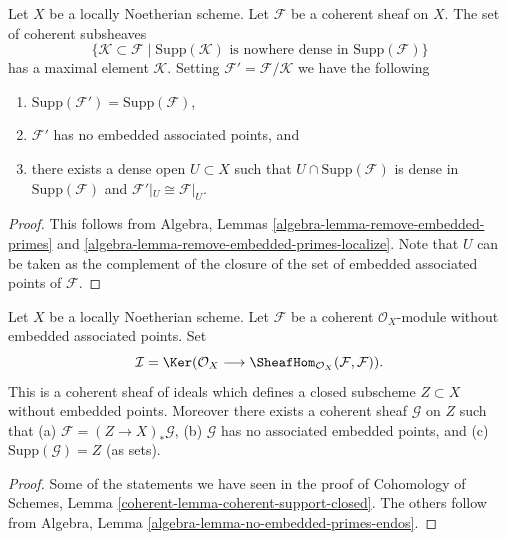 \begin{lemma}
\label{lemma-remove-embedded-points}
Let $X$ be a locally Noetherian scheme.
Let $\mathcal{F}$ be a coherent sheaf on $X$.
The set of coherent subsheaves
$$
\{
\mathcal{K} \subset \mathcal{F}
\mid
\text{Supp}(\mathcal{K})\text{ is nowhere dense in }\text{Supp}(\mathcal{F})
\}
$$
has a maximal element $\mathcal{K}$.
Setting $\mathcal{F}' = \mathcal{F}/\mathcal{K}$ we have the
following
\begin{enumerate}
\item $\text{Supp}(\mathcal{F}') = \text{Supp}(\mathcal{F})$,
\item $\mathcal{F}'$ has no embedded associated points, and
\item there exists a dense open $U \subset X$ such that
$U \cap \text{Supp}(\mathcal{F})$ is dense in $\text{Supp}(\mathcal{F})$
and $\mathcal{F}'|_U \cong \mathcal{F}|_U$.
\end{enumerate}
\end{lemma}

\begin{proof}
This follows from
Algebra, Lemmas \ref{algebra-lemma-remove-embedded-primes} and
\ref{algebra-lemma-remove-embedded-primes-localize}.
Note that $U$ can be taken as the complement of the closure
of the set of embedded associated points of $\mathcal{F}$.
\end{proof}

\begin{lemma}
\label{lemma-no-embedded-points-endos}
Let $X$ be a locally Noetherian scheme.
Let $\mathcal{F}$ be a coherent $\mathcal{O}_X$-module
without embedded associated points. Set
$$
\mathcal{I}
=
\Ker(\mathcal{O}_X
\longrightarrow
\SheafHom_{\mathcal{O}_X}(\mathcal{F}, \mathcal{F})).
$$
This is a coherent sheaf of ideals which defines a closed
subscheme $Z \subset X$ without embedded points. Moreover
there exists a coherent sheaf $\mathcal{G}$ on $Z$
such that (a) $\mathcal{F} = (Z \to X)_*\mathcal{G}$,
(b) $\mathcal{G}$ has no associated embedded points, and
(c) $\text{Supp}(\mathcal{G}) = Z$ (as sets).
\end{lemma}

\begin{proof}
Some of the statements we have seen in the proof of
Cohomology of Schemes, Lemma \ref{coherent-lemma-coherent-support-closed}.
The others follow from
Algebra, Lemma \ref{algebra-lemma-no-embedded-primes-endos}.
\end{proof}



